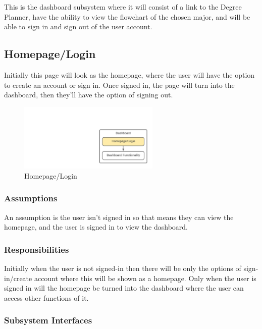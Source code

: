 This is the dashboard subsystem where it will consist of a link to the Degree Planner, have the ability to view the flowchart of the chosen major, and will be able to sign in and sign out of the user account. 

\subsection{Homepage/Login}
Initially this page will look as the homepage, where the user will have the option to create an account or sign in. Once signed in, the page will turn into the dashboard, then they'll have the option of signing out.

\begin{figure}[h!]
	\centering
 	\includegraphics[width=0.60\textwidth]{images/Dashboard_Pic1}
 \caption{Homepage/Login}
\end{figure}

\subsubsection{Assumptions}
An assumption is the user isn't signed in so that means they can view the homepage, and the user is signed in to view the dashboard. 

\subsubsection{Responsibilities}
Initially when the user is not signed-in then there will be only the options of sign-in/create account where this will be shown as a homepage. Only when the user is signed in will the homepage be turned into the dashboard where the user can access other functions of it.

\subsubsection{Subsystem Interfaces}

